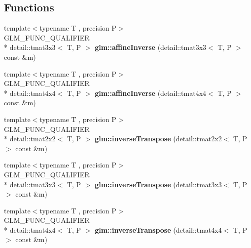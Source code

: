 \subsection*{Functions}
\begin{DoxyCompactItemize}
\item 
\hypertarget{namespaceglm_ae987f6c5b71756c91d1a4a6f65616ac9}{{\footnotesize template$<$typename T , precision P$>$ }\\G\-L\-M\-\_\-\-F\-U\-N\-C\-\_\-\-Q\-U\-A\-L\-I\-F\-I\-E\-R \\*
detail\-::tmat3x3$<$ T, P $>$ {\bfseries glm\-::affine\-Inverse} (detail\-::tmat3x3$<$ T, P $>$ const \&m)}\label{namespaceglm_ae987f6c5b71756c91d1a4a6f65616ac9}

\item 
\hypertarget{namespaceglm_a9c15fbd234b0504882c00b6bccc0f818}{{\footnotesize template$<$typename T , precision P$>$ }\\G\-L\-M\-\_\-\-F\-U\-N\-C\-\_\-\-Q\-U\-A\-L\-I\-F\-I\-E\-R \\*
detail\-::tmat4x4$<$ T, P $>$ {\bfseries glm\-::affine\-Inverse} (detail\-::tmat4x4$<$ T, P $>$ const \&m)}\label{namespaceglm_a9c15fbd234b0504882c00b6bccc0f818}

\item 
\hypertarget{namespaceglm_aadb5ab47ae129fe2b90f976465999629}{{\footnotesize template$<$typename T , precision P$>$ }\\G\-L\-M\-\_\-\-F\-U\-N\-C\-\_\-\-Q\-U\-A\-L\-I\-F\-I\-E\-R \\*
detail\-::tmat2x2$<$ T, P $>$ {\bfseries glm\-::inverse\-Transpose} (detail\-::tmat2x2$<$ T, P $>$ const \&m)}\label{namespaceglm_aadb5ab47ae129fe2b90f976465999629}

\item 
\hypertarget{namespaceglm_a821bc03bbd402ee2f77ba43c17a9c24e}{{\footnotesize template$<$typename T , precision P$>$ }\\G\-L\-M\-\_\-\-F\-U\-N\-C\-\_\-\-Q\-U\-A\-L\-I\-F\-I\-E\-R \\*
detail\-::tmat3x3$<$ T, P $>$ {\bfseries glm\-::inverse\-Transpose} (detail\-::tmat3x3$<$ T, P $>$ const \&m)}\label{namespaceglm_a821bc03bbd402ee2f77ba43c17a9c24e}

\item 
\hypertarget{namespaceglm_aaf03d778a4023049e562c382ad880d56}{{\footnotesize template$<$typename T , precision P$>$ }\\G\-L\-M\-\_\-\-F\-U\-N\-C\-\_\-\-Q\-U\-A\-L\-I\-F\-I\-E\-R \\*
detail\-::tmat4x4$<$ T, P $>$ {\bfseries glm\-::inverse\-Transpose} (detail\-::tmat4x4$<$ T, P $>$ const \&m)}\label{namespaceglm_aaf03d778a4023049e562c382ad880d56}

\end{DoxyCompactItemize}


